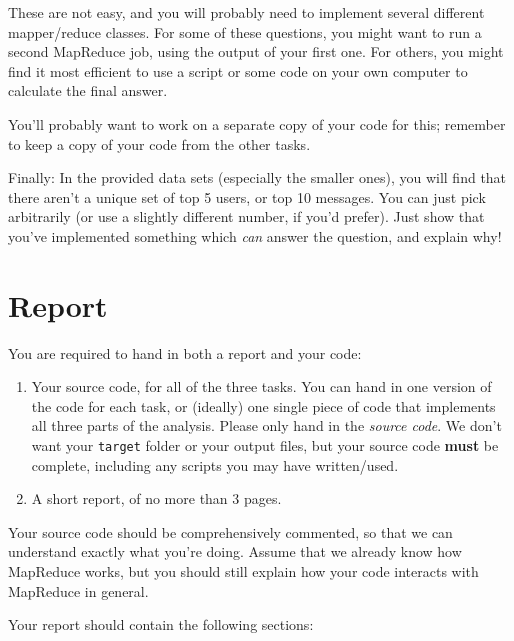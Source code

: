 \documentclass[a4paper,10pt]{article}
\begin{document}
  These are not easy, and you will probably need to implement several different mapper/reduce classes. For some of these questions, you might want to run a second MapReduce job, using the output of your first one. For others, you might find it most efficient to use a script or some code on your own computer to calculate the final answer.

  You'll probably want to work on a separate copy of your code for this; remember to keep a copy of your code from the other tasks.

  Finally: In the provided data sets (especially the smaller ones), you will find that there aren't a unique set of top 5 users, or top 10 messages.
  You can just pick arbitrarily (or use a slightly different number, if you'd prefer). Just show that you've implemented something which \emph{can}
  answer the question, and explain why!

  \pagebreak
  \section{Report} \label{sec:report}

  You are required to hand in both a report and your code:
  
  \begin{enumerate}
    \item Your source code, for all of the three tasks. You can hand in one version of the code for each task, or (ideally) one single piece of code that implements all three parts of the analysis. Please only hand in the \emph{source code}. We don't want your \texttt{target} folder or your output files, but your source code \textbf{must} be complete, including any scripts you may have written/used.
    \item A short report, of no more than 3 pages.
  \end{enumerate}

  Your source code should be comprehensively commented, so that we can understand exactly what you're doing. Assume that we already know how
  MapReduce works, but you should still explain how your code interacts with MapReduce in general.
  
  Your report should contain the following sections:
  
\end{document}
